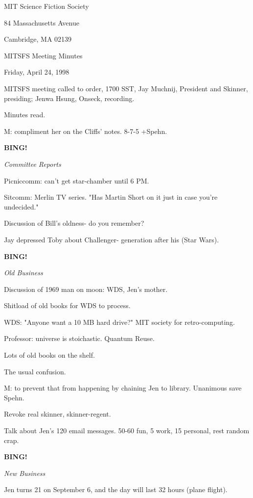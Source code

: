\documentclass[12pt]{article}
\newcommand{\bing}{{\bf BING!} }
\newcommand{\goto}[1]{\bing \vskip 12pt \centerline{{\em{#1}}}}
\begin{document}
\begin{center}

MIT Science Fiction Society 

84 Massachusetts Avenue

Cambridge, MA 02139

\vspace{12pt}

MITSFS Meeting Minutes 

Friday, April 24, 1998

\end{center}
 
\vspace{18pt}

\setlength{\parskip}{6pt}

\noindent
MITSFS meeting called to order, 1700 SST,
Jay Muchnij, President and Skinner, presiding; Jenwa Hsung, Onseck, recording.

Minutes read.

M: compliment her on the Cliffs' notes. 8-7-5 +Spehn.

\goto{Committee Reports}

Picniccomm: can't get star-chamber until 6 PM.

Sitcomm: Merlin TV series. "Has Martin Short on it just in case you're undecided."

Discussion of Bill's oldness- do you remember?

Jay depressed Toby about Challenger- generation after his (Star Wars).

\goto{Old Business}

Discussion of 1969 man on moon: WDS, Jen's mother.

Shitload of old books for WDS to process.

WDS: "Anyone want a 10 MB hard drive?" MIT society for retro-computing.

Professor: universe is stoichastic. Quantum Reuse.

Lots of old books on the shelf.

The usual confusion.

M: to prevent that from happening by chaining Jen to library. Unanimous save Spehn.

Revoke real skinner, skinner-regent.

Talk about Jen's 120 email messages. 50-60 fun, 5 work, 15 personal, rest random crap.

\goto{New Business}

Jen turns 21 on September 6, and the day will last 32 hours (plane flight).
\end{document}
